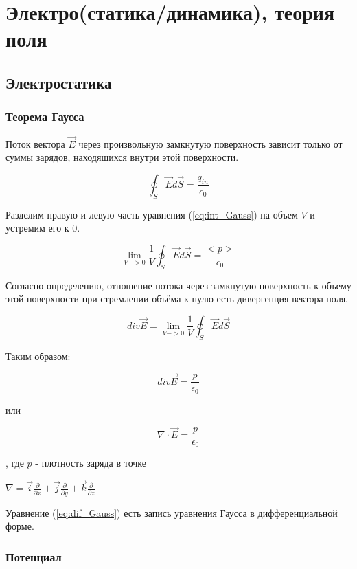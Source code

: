 \section{Электро(статика/динамика), теория поля}
	\subsection{Электростатика}
		\subsubsection{Теорема Гаусса}
		
		Поток вектора $\overrightarrow{E}$ через произвольную замкнутую поверхность зависит только от суммы зарядов, находящихся внутри этой поверхности.
		
\begin{equation} \label{eq:int_Gauss}
\oint_{S} \overrightarrow{E} d \overrightarrow{S} = \frac{q_{in}}{\epsilon_{0}}
\end{equation}

Разделим правую и левую часть уравнения (\ref{eq:int_Gauss}) на объем $V$ и устремим его к 0.

\begin{equation}
\lim_{V -> 0} \frac{1}{V} \oint_{S} \overrightarrow{E} d \overrightarrow{S} = \frac{<p>}{\epsilon_0}
\end{equation}

Согласно определению, отношение потока через замкнутую поверхность к объему этой поверхности при стремлении объёма к нулю есть дивергенция вектора поля.

\begin{equation}
div \overrightarrow{E} =  \lim_{V -> 0} \frac{1}{V} \oint_{S} \overrightarrow{E} d \overrightarrow{S}
\end{equation}

Таким образом:

\begin{equation}
div \overrightarrow{E} = \frac{p}{\epsilon_0}
\end{equation}

или

\begin{equation} \label{eq:dif_Gauss}
\nabla \cdot  \overrightarrow{E} = \frac{p}{\epsilon_0}
\end{equation}

, где $p$ - плотность заряда в точке

$\nabla =  \overrightarrow{i} \frac{\partial}{\partial x} + \overrightarrow{j} \frac{\partial}{\partial y} + \overrightarrow{k} \frac{\partial}{\partial z}$

Уравнение (\ref{eq:dif_Gauss}) есть запись уравнения Гаусса в дифференциальной форме.


\subsubsection{Потенциал}

